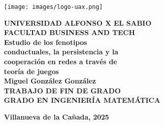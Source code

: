 \documentclass[a4paper,12pt]{report}
\begin{document}
\justifying
\begin{titlepage}
    \thispagestyle{empty} %
    \begin{center}
    \centering
    \vspace*{-3cm} %
    \texttt{[image: images/logo-uax.png]} %
    \vspace{1cm}

    {\large \textbf{UNIVERSIDAD ALFONSO X EL SABIO}} \\[0.5cm] %
    {\large \textbf{FACULTAD BUSINESS AND TECH}} \\[1cm] %

    {\LARGE \textbf{
    Estudio de los fenotipos \\[0.3cm]
    conductuales, la persistencia y la\\[0.3cm]
    cooperación en redes a través de\\[0.3cm]
    teoría de juegos
    }} \\[1.3cm]

    {\large \textbf{Miguel González González}} \\[3 cm]

    {\Large \textbf{TRABAJO DE FIN DE GRADO}} \\[0.5cm]
    {\Large \textbf{GRADO EN INGENIERÍA MATEMÁTICA}}
    

    \vfill %
    \textbf{Villanueva de la Cañada, 2025} \\

    \vspace*{1cm}
    \end{center}
\end{titlepage}
\newpage
\end{document}
